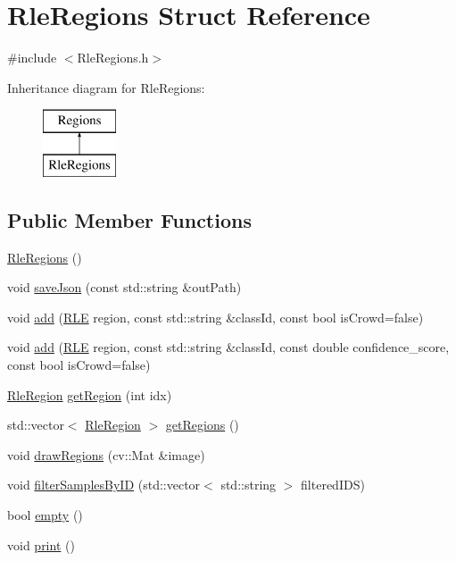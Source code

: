 \hypertarget{struct_rle_regions}{}\section{Rle\+Regions Struct Reference}
\label{struct_rle_regions}


{\ttfamily \#include $<$Rle\+Regions.\+h$>$}

Inheritance diagram for Rle\+Regions\+:\begin{figure}[H]
\begin{center}
\leavevmode
\includegraphics[height=2.000000cm]{struct_rle_regions}
\end{center}
\end{figure}
\subsection*{Public Member Functions}
\begin{DoxyCompactItemize}
\item 
\hyperlink{struct_rle_regions_af02a61ff467f90320aa1980ec6924710}{Rle\+Regions} ()
\item 
void \hyperlink{struct_rle_regions_a643c55d59720ba45a78e0e6090018e05}{save\+Json} (const std\+::string \&out\+Path)
\item 
void \hyperlink{struct_rle_regions_a4d7fd1bdb03c494c5ebe66e940337a73}{add} (\hyperlink{struct_r_l_e}{R\+LE} region, const std\+::string \&class\+Id, const bool is\+Crowd=false)
\item 
void \hyperlink{struct_rle_regions_a537a1a2b789d4d95fd579a82baf89f2f}{add} (\hyperlink{struct_r_l_e}{R\+LE} region, const std\+::string \&class\+Id, const double confidence\+\_\+score, const bool is\+Crowd=false)
\item 
\hyperlink{struct_rle_region}{Rle\+Region} \hyperlink{struct_rle_regions_a0188b60eb616945a63ad9dd14a167392}{get\+Region} (int idx)
\item 
std\+::vector$<$ \hyperlink{struct_rle_region}{Rle\+Region} $>$ \hyperlink{struct_rle_regions_a66101430c60a2e954c9f9b197bbd4030}{get\+Regions} ()
\item 
void \hyperlink{struct_rle_regions_aedcc9f614d38a2882a589e3014799d91}{draw\+Regions} (cv\+::\+Mat \&image)
\item 
void \hyperlink{struct_rle_regions_a50e7df1873c11d5436cbe875593c331b}{filter\+Samples\+By\+ID} (std\+::vector$<$ std\+::string $>$ filtered\+I\+DS)
\item 
bool \hyperlink{struct_rle_regions_acaea73c92cdcff78a60d1e10bed62c3d}{empty} ()
\item 
void \hyperlink{struct_rle_regions_a83e335ebc08dd7029bdc76baa8b71b32}{print} ()
\end{DoxyCompactItemize}
